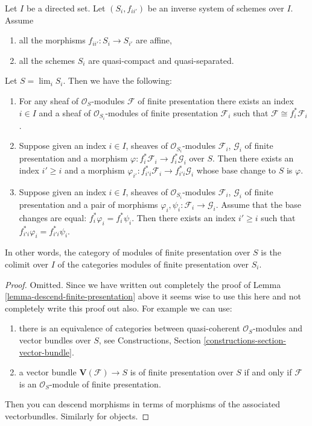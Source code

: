 \begin{lemma}
\label{lemma-descend-modules-finite-presentation}
Let $I$ be a directed set.
Let $(S_i, f_{ii'})$ be an inverse system of schemes over $I$.
Assume
\begin{enumerate}
\item all the morphisms $f_{ii'} : S_i \to S_{i'}$ are affine,
\item all the schemes $S_i$ are quasi-compact and quasi-separated.
\end{enumerate}
Let $S = \lim_i S_i$. Then we have the following:
\begin{enumerate}
\item For any sheaf of $\mathcal{O}_S$-modules
$\mathcal{F}$ of finite presentation there exists an index
$i \in I$ and a sheaf of $\mathcal{O}_{S_i}$-modules of finite
presentation $\mathcal{F}_i$ such that
$\mathcal{F} \cong f_i^*\mathcal{F}_i$.
\item Suppose given an index $i \in I$, sheaves
of $\mathcal{O}_{S_i}$-modules $\mathcal{F}_i$, $\mathcal{G}_i$
of finite presentation and a morphism
$\varphi : f_i^*\mathcal{F}_i \to f_i^*\mathcal{G}_i$ over $S$.
Then there exists an index $i' \geq i$ and a morphism
$\varphi_{i'} : f_{i'i}^*\mathcal{F}_i \to f_{i'i}^*\mathcal{G}_i$
whose base change to $S$ is $\varphi$.
\item Suppose given an index $i \in I$, sheaves of $\mathcal{O}_{S_i}$-modules
$\mathcal{F}_i$, $\mathcal{G}_i$ of finite presentation
and a pair of morphisms $\varphi_i, \psi_i : \mathcal{F}_i \to \mathcal{G}_i$.
Assume that the base changes are equal: $f_i^*\varphi_i = f_i^*\psi_i$.
Then there exists an index $i' \geq i$ such that
$f_{i'i}^*\varphi_i = f_{i'i}^*\psi_i$.
\end{enumerate}
In other words, the category of modules
of finite presentation over $S$ is the colimit over $I$
of the categories modules of finite presentation over $S_i$.
\end{lemma}

\begin{proof}
Omitted. Since we have written out completely the proof of
Lemma \ref{lemma-descend-finite-presentation} above
it seems wise to use this here and not completely write this
proof out also. For example we can use:
\begin{enumerate}
\item there is an equivalence of categories
between quasi-coherent $\mathcal{O}_S$-modules and
vector bundles over $S$, see
Constructions, Section \ref{constructions-section-vector-bundle}.
\item a vector bundle $\mathbf{V}(\mathcal{F}) \to S$ is
of finite presentation over $S$ if and only if $\mathcal{F}$
is an $\mathcal{O}_S$-module of finite presentation.
\end{enumerate}
Then you can descend morphisms in terms of morphisms of the
associated vectorbundles. Similarly for objects.
\end{proof}


